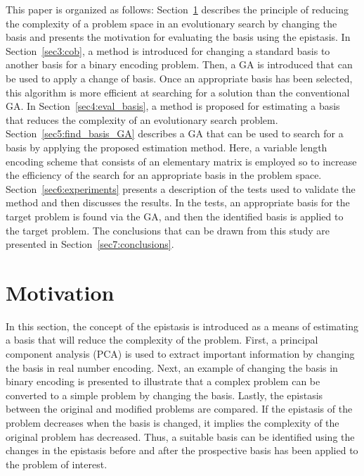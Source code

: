 This paper is organized as follows: Section~\ref{sec2:motivation} describes the principle of reducing the complexity of a problem space in an evolutionary search by changing the basis and presents the motivation for evaluating the basis using the epistasis. In Section~\ref{sec3:cob}, a method is introduced for changing a standard basis to another basis for a binary encoding problem. Then, a GA is introduced that can be used to apply a change of basis. Once an appropriate basis has been selected, this algorithm is more efficient at searching for a solution than the conventional GA. In Section~\ref{sec4:eval_basis}, a method is proposed for estimating a basis that reduces the complexity of an evolutionary search problem. Section~\ref{sec5:find_basis_GA} describes a GA that can be used to search for a basis by applying the proposed estimation method. Here, a variable length encoding scheme that consists of an elementary matrix is employed so to increase the efficiency of the search for an appropriate basis in the problem space. Section~\ref{sec6:experiments} presents a description of the tests used to validate the method and then discusses the results. In the tests, an appropriate basis for the target problem is found via the GA, and then the identified basis is applied to the target problem. The conclusions that can be drawn from this study are presented in Section~\ref{sec7:conclusions}.


\section{Motivation} \label{sec2:motivation}
In this section, the concept of the epistasis is introduced as a means of estimating a basis that will reduce the complexity of the problem. First, a principal component analysis (PCA) is used to extract important information by changing the basis in real number encoding. Next, an example of changing the basis in binary encoding is presented to illustrate that a complex problem can be converted to a simple problem by changing the basis. Lastly, the epistasis between the original and modified problems are compared. If the epistasis of the problem decreases when the basis is changed, it implies the complexity of the original problem has decreased. Thus, a suitable basis can be identified using the changes in the epistasis before and after the prospective basis has been applied to the problem of interest.

